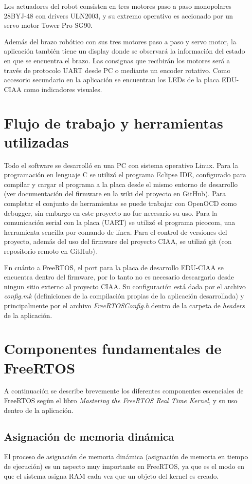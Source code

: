 \documentclass{IEEEtran}
\begin{document}
Los actuadores del robot consisten en tres motores paso a paso monopolares 28BYJ-48 con drivers ULN2003, y su extremo operativo es accionado por un servo motor Tower Pro SG90.

Además del brazo robótico con sus tres motores paso a paso y servo motor, la aplicación también tiene un display donde se observará la información del estado en que se encuentra el brazo. Las consignas que recibirán los motores será a través de protocolo UART desde PC o mediante un encoder rotativo. Como accesorio secundario en la aplicación se encuentran los LEDs de la placa EDU-CIAA como indicadores visuales.

\section{Flujo de trabajo y herramientas utilizadas}
Todo el software se desarrolló en una PC con sistema operativo Linux. Para la programación en lenguaje C se utilizó el programa Eclipse IDE, configurado para compilar y cargar el programa a la placa desde el mismo entorno de desarrollo (ver documentación del firmware en la wiki del proyecto\cite{ciaa-wiki} en GitHub). Para completar el conjunto de herramientas se puede trabajar con OpenOCD como debugger, sin embargo en este proyecto no fue necesario su uso. Para la comunicación serial con la placa (UART) se utilizó el programa picocom, una herramienta sencilla por comando de línea. Para el control de versiones del proyecto, además del uso del firmware del proyecto CIAA, se utilizó git (con repositorio remoto en GitHub).

En cuánto a FreeRTOS, el port para la placa de desarrollo EDU-CIAA se encuentra dentro del firmware, por lo tanto no es necesario descargarlo desde ningun sitio externo al proyecto CIAA. Su configuración está dada por el archivo \textit{config.mk} (definiciones de la compilación propias de la aplicación desarrollada) y principalmente por el archivo \textit{FreeRTOSConfig.h} dentro de la carpeta de \textit{headers} de la aplicación.

\section{Componentes fundamentales de FreeRTOS}
A continuación se describe brevemente los diferentes componentes escenciales de FreeRTOS según el libro \textit{Mastering the FreeRTOS Real Time Kernel}, y su uso dentro de la aplicación.

\subsection{Asignación de memoria dinámica}
El proceso de asignación de memoria dinámica (asignación de memoria en tiempo de ejecución) es un aspecto muy importante en FreeRTOS, ya que es el modo en que el sistema asigna RAM cada vez que un objeto del kernel es creado.
\end{document}
